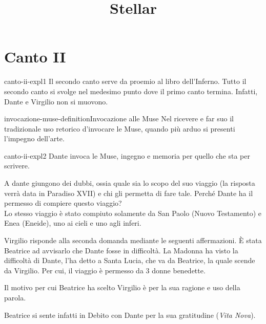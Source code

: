 \documentclass[preview]{standalone}
\begin{document}
\title{Stellar}
\genpage

\section{Canto II}

\begin{snippet}{canto-ii-expl1}
    Il secondo canto serve da proemio al libro dell'Inferno.
    Tutto il secondo canto si svolge nel medesimo punto dove il primo canto termina.
    Infatti, Dante e Virgilio non si muovono.
\end{snippet}

\begin{snippetdefinition}{invocazione-muse-definition}{Invocazione alle Muse}
    Nel ricevere e far suo il tradizionale uso retorico d'invocare le Muse, quando più arduo si presenti l'impegno dell'arte.
\end{snippetdefinition}

\begin{snippet}{canto-ii-expl2}
    Dante invoca le Muse, ingegno e memoria per quello che sta per scrivere.

    A dante giungono dei dubbi, ossia quale sia lo scopo del suo viaggio
    (la risposta verrà data in Paradiso XVII) e chi gli permetta di fare tale.
    Perché Dante ha il permesso di compiere questo viaggio?
    \\
    Lo stesso viaggio è stato compiuto solamente da San Paolo (Nuovo Testamento)
    e Enea (Eneide), uno ai cieli e uno agli inferi.
    
    Virgilio risponde alla seconda domanda mediante le seguenti affermazioni.
    È stata Beatrice ad avvisarlo che Dante fosse in difficoltà.
    La Madonna ha visto la difficoltà di Dante, l'ha detto a Santa Lucia, che va da Beatrice,
    la quale scende da Virgilio.
    Per cui, il viaggio è permesso da 3 donne benedette.
    \begin{center}
    \end{center}
    Il motivo per cui Beatrice ha scelto Virgilio è per la sua ragione e uso della parola.
    
    Beatrice si sente infatti in Debito con Dante per la sua gratitudine (\textit{Vita Nova}).
\end{snippet}
\end{document}
